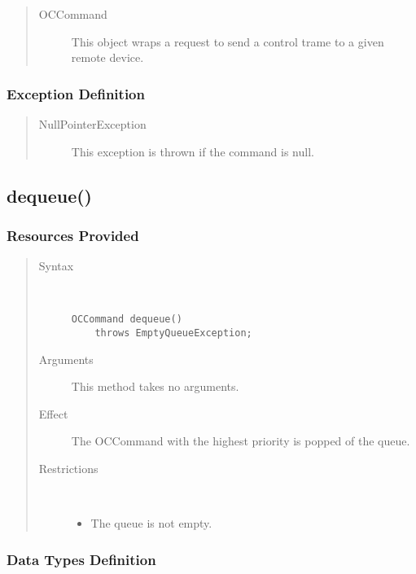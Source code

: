 \begin{quote}
	\begin{description}
		\item[OCCommand] This object wraps a request to send a control trame to a
		given remote device.
	\end{description} 
\end{quote}

\subsubsection{Exception Definition}

\begin{quote}
	\begin{description}
		\item[NullPointerException] This exception is thrown if the command is null.
	\end{description} 
\end{quote}

\subsection{dequeue()}

\subsubsection{Resources Provided}

\begin{quote}
	\begin{description}
		\item[Syntax] \ 
		\begin{verbatim}
OCCommand dequeue() 
    throws EmptyQueueException;
		\end{verbatim}
		\item[Arguments] This method takes no arguments.
		\item[Effect] The OCCommand with the highest priority is popped of the queue.
		\item[Restrictions] \ 
		\begin{itemize}
			\item The queue is not empty. 
		\end{itemize}
	\end{description} 
\end{quote}

\subsubsection{Data Types Definition}

